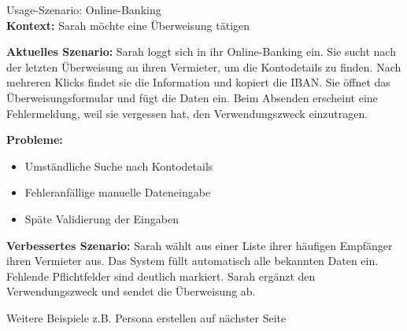 \begin{example2}{Usage-Szenario: Online-Banking}\\
\textbf{Kontext:} Sarah möchte eine Überweisung tätigen

\textbf{Aktuelles Szenario:}
Sarah loggt sich in ihr Online-Banking ein. Sie sucht nach der letzten Überweisung an ihren Vermieter, um die Kontodetails zu finden. Nach mehreren Klicks findet sie die Information und kopiert die IBAN. Sie öffnet das Überweisungsformular und fügt die Daten ein. Beim Absenden erscheint eine Fehlermeldung, weil sie vergessen hat, den Verwendungszweck einzutragen.

\textbf{Probleme:}
\begin{itemize}
    \item Umständliche Suche nach Kontodetails
    \item Fehleranfällige manuelle Dateneingabe
    \item Späte Validierung der Eingaben
\end{itemize}

\textbf{Verbessertes Szenario:}
Sarah wählt aus einer Liste ihrer häufigen Empfänger ihren Vermieter aus. Das System füllt automatisch alle bekannten Daten ein. Fehlende Pflichtfelder sind deutlich markiert. Sarah ergänzt den Verwendungszweck und sendet die Überweisung ab.
\end{example2}

\begin{remark}
    Weitere Beispiele z.B. Persona erstellen auf nächster Seite
\end{remark}

